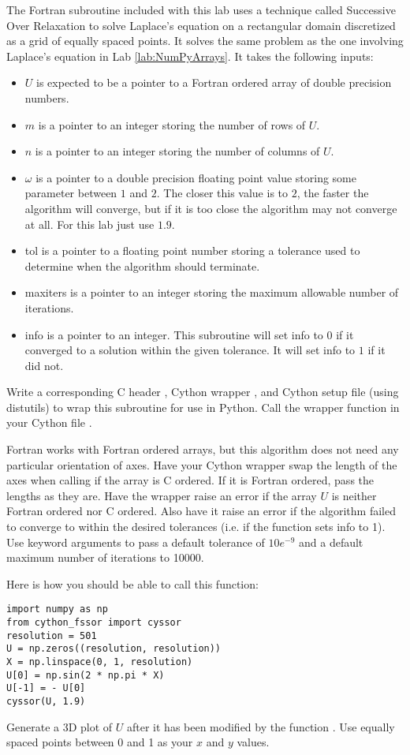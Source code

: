 \begin{problem}
The Fortran subroutine  included with this lab uses a technique called Successive Over Relaxation to solve Laplace's equation on a rectangular domain discretized as a grid of equally spaced points.
It solves the same problem as the one involving Laplace's equation in Lab \ref{lab:NumPyArrays}.
It takes the following inputs:
\begin{itemize}
\item $U$ is expected to be a pointer to a Fortran ordered array of double precision numbers.
\item $m$ is a pointer to an integer storing the number of rows of $U$.
\item $n$ is a pointer to an integer storing the number of columns of $U$.
\item $\omega$ is a pointer to a double precision floating point value storing some parameter between $1$ and $2$.
The closer this value is to $2$, the faster the algorithm will converge, but if it is too close the algorithm may not converge at all.
For this lab just use $1.9$.
\item tol is a pointer to a floating point number storing a tolerance used to determine when the algorithm should terminate.
\item maxiters is a pointer to an integer storing the maximum allowable number of iterations.
\item info is a pointer to an integer.
This subroutine will set info to $0$ if it converged to a solution within the given tolerance.
It will set info to $1$ if it did not.
\end{itemize}

Write a corresponding C header , Cython wrapper , and Cython setup file (using distutils)  to wrap this subroutine for use in Python.
Call the wrapper function in your Cython file .

Fortran works with Fortran ordered arrays, but this algorithm does not need any particular orientation of axes.
Have your Cython wrapper swap the length of the axes when calling  if the array is C ordered.
If it is Fortran ordered, pass the lengths as they are.
Have the wrapper raise an error if the array $U$ is neither Fortran ordered nor C ordered.
Also have it raise an error if the algorithm failed to converge to within the desired tolerances (i.e. if the function sets info to 1).
Use keyword arguments to pass  a default tolerance of $10e^{-9}$ and a default maximum number of iterations to 10000.

Here is how you should be able to call this function:
\begin{lstlisting}
import numpy as np
from cython_fssor import cyssor
resolution = 501
U = np.zeros((resolution, resolution))
X = np.linspace(0, 1, resolution)
U[0] = np.sin(2 * np.pi * X)
U[-1] = - U[0]
cyssor(U, 1.9)
\end{lstlisting}

Generate a 3D plot of $U$ after it has been modified by the function .
Use equally spaced points between 0 and 1 as your $x$ and $y$ values.
\end{problem}




